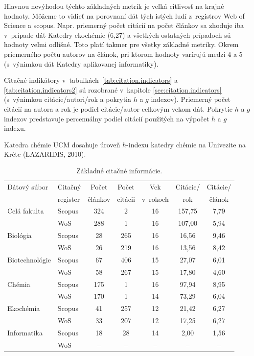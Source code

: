 Hlavnou nevýhodou týchto základných metrík je veľká citlivosť na krajné hodnoty.
Môžeme to vidieť na porovnaní dát tých istých ľudí z~registrov Web of Science a
scopus.  Napr. priemerný počet citácií na počet článkov sa zhoduje iba v~prípade
dát Katedry ekochémie (6,27) a všetkých ostatných prípadoch sú hodnoty veľmi
odlišné.  Toto platí takmer pre všetky základné metriky.  Okrem priemerného
počtu autorov na článok, pri ktorom hodnoty varírujú medzi 4 a 5 (s~výnimkou dát
Katedry aplikovanej informatiky).

Citačné indikátory v~tabuľkách~\ref{tab:citation.indicators} a
\ref{tab:citation.indicators2} sú rozobrané v~kapitole
\ref{sec:citation.indicators} (s~výnimkou citácie/autori/rok a pokrytia $h$ a
$g$ indexov).  Priemerný počet citácií na autora a rok je podiel citácie/autor
celkovým vekom dát.  Pokrytie $h$ a $g$ indexov predstavuje percenuálny podiel
citácií použitých na výpočet $h$ a $g$ indexu.

Katedra chémie UCM dosahuje úroveň $h$-indexu katedry chémie na Univezite na Kréte
(LAZARIDIS, 2010).

\begin{table}
\centering\small
\begin{tabular}{llccccc}
  \hline\noalign{\vspace{.3ex}}
  Dátový súbor & Citačný  & Počet   & Počet   & Vek      & Citácie/ & Citácie/ \\
               & register & článkov & citácii & v~rokoch & rok      & článok   \\[0.3ex]
  \hline\noalign{\vspace{.5ex}}
  Celá fakulta   & Scopus & 324 & 2\:524 & 16 & 157,75 & 7,79 \\
                 & WoS    & 288 & 1\:712 & 16 & 107,00 & 5,94 \\[1ex]
  Biológia       & Scopus &  28 &    265 & 16 &  16,56 & 9,46 \\
                 & WoS    &  26 &    219 & 16 &  13,56 & 8,42 \\[1ex]
  Biotechnológie & Scopus &  67 &    406 & 15 &  27,07 & 6,01 \\
                 & WoS    &  58 &    267 & 15 &  17,80 & 4,60 \\[1ex]
  Chémia         & Scopus & 175 & 1\:567 & 16 &  97,94 & 8,95 \\
                 & WoS    & 170 & 1\:026 & 14 &  73,29 & 6,04 \\[1ex]
  Ekochémia      & Scopus &  41 &    257 & 12 &  21,42 & 6,27 \\
                 & WoS    &  33 &    207 & 12 &  17,25 & 6,27 \\[1ex]
  Informatika    & Scopus &  18 &     28 & 14 &   2,00 & 1,56 \\
                 & WoS    &  -- &     -- & -- &  --    & --   \\[0.5ex]
  \hline
\end{tabular}
\caption{Základné citačné informácie.}
\label{tab:citation.info}
\end{table}



